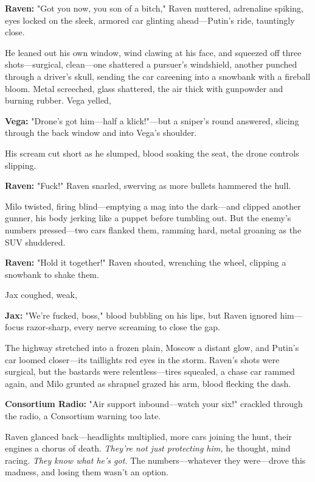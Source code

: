 \documentclass[12pt]{book}
\begin{document}
\vspace{0.5em}
\textbf{Raven:} "Got you now, you son of a bitch," Raven muttered, adrenaline spiking, eyes locked on the sleek, armored car glinting ahead—Putin’s ride, tauntingly close.

He leaned out his own window, wind clawing at his face, and squeezed off three shots—surgical, clean—one shattered a pursuer’s windshield, another punched through a driver’s skull, sending the car careening into a snowbank with a fireball bloom. Metal screeched, glass shattered, the air thick with gunpowder and burning rubber. Vega yelled,

\vspace{0.5em}
\textbf{Vega:} "Drone’s got him—half a klick!"—but a sniper’s round answered, slicing through the back window and into Vega’s shoulder.

His scream cut short as he slumped, blood soaking the seat, the drone controls slipping.

\vspace{0.5em}
\textbf{Raven:} "Fuck!" Raven snarled, swerving as more bullets hammered the hull.

Milo twisted, firing blind—emptying a mag into the dark—and clipped another gunner, his body jerking like a puppet before tumbling out. But the enemy’s numbers pressed—two cars flanked them, ramming hard, metal groaning as the SUV shuddered.

\vspace{0.5em}
\textbf{Raven:} "Hold it together!" Raven shouted, wrenching the wheel, clipping a snowbank to shake them.

Jax coughed, weak,

\vspace{0.5em}
\textbf{Jax:} "We’re fucked, boss," blood bubbling on his lips, but Raven ignored him—focus razor-sharp, every nerve screaming to close the gap.

The highway stretched into a frozen plain, Moscow a distant glow, and Putin’s car loomed closer—its taillights red eyes in the storm. Raven’s shots were surgical, but the bastards were relentless—tires squealed, a chase car rammed again, and Milo grunted as shrapnel grazed his arm, blood flecking the dash.

\vspace{0.5em}
\textbf{Consortium Radio:} "Air support inbound—watch your six!" crackled through the radio, a Consortium warning too late.

Raven glanced back—headlights multiplied, more cars joining the hunt, their engines a chorus of death. \textit{They’re not just protecting him,} he thought, mind racing. \textit{They know what he’s got.} The numbers—whatever they were—drove this madness, and losing them wasn’t an option.
\end{document}
